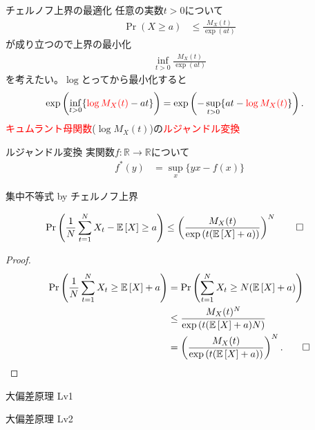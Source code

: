 \documentclass[lualatex,handout]{beamer}
\newcommand{\emm}[1]{\textcolor{red}{#1}}
\newcommand{\expt}[1]{\mathbb{E}\left[#1\right]}
\theoremstyle{definition}
\begin{document}
\begin{frame}{チェルノフ上界の最適化}
任意の実数$t>0$について
\begin{align*}
\Pr(X\ge a)&\le\frac{M_X(t)}{\exp(at)}
\end{align*}
が成り立つので上界の最小化
\begin{align*}
\inf_{t>0} \frac{M_X(t)}{\exp(at)}
\end{align*}
を考えたい。$\log$とってから最小化すると
\begin{align*}
\exp\left(\inf_{t>0} \{\emm{\log M_X(t)} - at\}\right)
&=
\exp\left(-\sup_{t>0} \{at - \emm{\log M_X(t)}\}\right)
.
\end{align*}
\emm{キュムラント母関数}($\log M_X(t)$)の\emm{ルジャンドル変換}
\end{frame}

\begin{frame}{ルジャンドル変換}
実関数$f\colon\mathbb{R}\to\mathbb{R}$について
\begin{align*}
f^*(y) &= \sup_x\{yx - f(x)\}
\end{align*}
\end{frame}

\begin{frame}{集中不等式 by チェルノフ上界}
\begin{lemma}
\begin{align*}
\Pr\left(\frac1N\sum_{t=1}^N X_t-\expt{X}\ge a\right) &\le \left(\frac{M_X(t)}{\exp\left(t(\expt{X}+ a)\right)}\right)^N\qedhere
\end{align*}
\end{lemma}
\begin{proof}
\small
\begin{align*}
\Pr\left(\frac1N\sum_{t=1}^N X_t\ge \expt{X}+ a\right) &=
\Pr\left(\sum_{t=1}^N X_t\ge N(\expt{X}+ a)\right)\\
&\le\frac{M_X(t)^N}{\exp\left(t(\expt{X}+ a)N\right)}\\
&=\left(\frac{M_X(t)}{\exp\left(t(\expt{X}+ a)\right)}\right)^N.\qedhere
\end{align*}
\end{proof}
\end{frame}

\begin{frame}{大偏差原理 Lv1}
\begin{theorem}[クラメールの定理]
\end{theorem}
\end{frame}

\begin{frame}{大偏差原理 Lv2}
\begin{theorem}[サノフの定理]
\end{theorem}
\end{frame}
\end{document}
